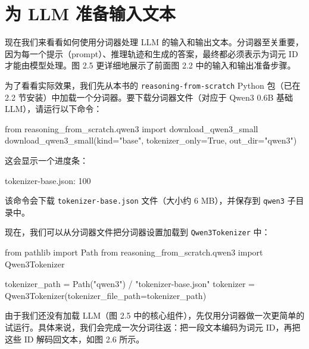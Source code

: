 \section{为 LLM 准备输入文本}

现在我们来看看如何使用分词器处理 LLM 的输入和输出文本。分词器至关重要，因为每一个提示（prompt）、推理轨迹和生成的答案，最终都必须表示为词元 ID 才能由模型处理。图 2.5 更详细地展示了前面图 2.2 中的输入和输出准备步骤。


为了看看实际效果，我们先从本书的 \texttt{reasoning-from-scratch} Python 包（已在 2.2 节安装）中加载一个分词器。要下载分词器文件（对应于 Qwen3 0.6B 基础 LLM），请运行以下命令：

\begin{codebox}
from reasoning_from_scratch.qwen3 import download_qwen3_small
download_qwen3_small(kind="base", tokenizer_only=True, out_dir="qwen3")
\end{codebox}

这会显示一个进度条：

\begin{codebox}
tokenizer-base.json: 100%
\end{codebox}

该命令会下载 \texttt{tokenizer-base.json} 文件（大小约 6 MB），并保存到 \texttt{qwen3} 子目录中。

现在，我们可以从分词器文件把分词器设置加载到 \texttt{Qwen3Tokenizer} 中：

\begin{codebox}
from pathlib import Path
from reasoning_from_scratch.qwen3 import Qwen3Tokenizer

tokenizer_path = Path("qwen3") / "tokenizer-base.json"
tokenizer = Qwen3Tokenizer(tokenizer_file_path=tokenizer_path)
\end{codebox}

由于我们还没有加载 LLM（图 2.5 中的核心组件），先仅用分词器做一次更简单的试运行。具体来说，我们会完成一次分词往返：把一段文本编码为词元 ID，再把这些 ID 解码回文本，如图 2.6 所示。


